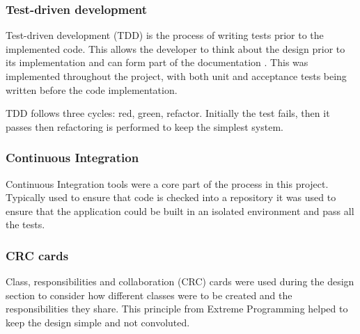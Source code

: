 \subsubsection{Test-driven development}
Test-driven development (TDD) is the process of writing tests prior to the implemented code. This allows the developer to think about the design prior to its implementation and can form part of the documentation \cite{citeulike:14014361}. This was implemented throughout the project, with both unit and acceptance tests being written before the code implementation.

TDD follows three cycles: red, green, refactor. Initially the test fails, then it passes then refactoring is performed to keep the simplest system.

\subsubsection{Continuous Integration}
Continuous Integration tools were a core part of the process in this project. Typically used to ensure that code is checked into a repository it was used to ensure that the application could be built in an isolated environment and pass all the tests.

\subsubsection{CRC cards}
Class, responsibilities and collaboration (CRC) cards \cite{citeulike:13398676} were used during the design section to consider how different classes were to be created and the responsibilities they share. This principle from Extreme Programming helped to keep the design simple and not convoluted.
